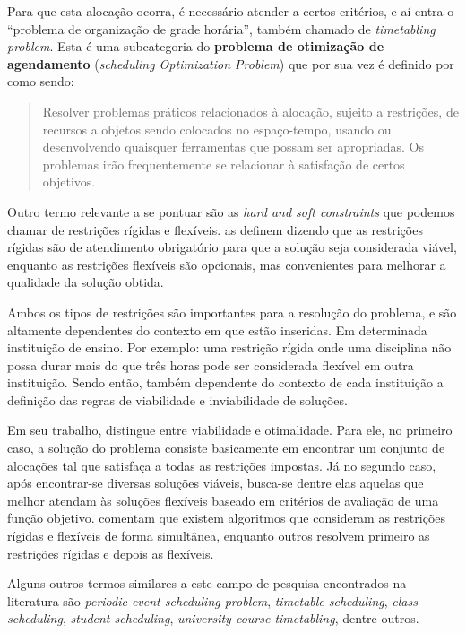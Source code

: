Para que esta alocação ocorra, é necessário atender a certos critérios, e aí entra o ``problema de organização de grade horária'', também chamado de \textit{timetabling problem}. Esta é uma subcategoria do \textbf{problema de otimização de agendamento} (\textit{scheduling Optimization Problem}) \cite{Alencar2019} que por sua vez é definido por  como sendo:

\begin{quote}\footnotesize
  Resolver problemas práticos relacionados à alocação, sujeito a restrições, de recursos a objetos sendo colocados no espaço-tempo, usando ou desenvolvendo quaisquer ferramentas que possam ser apropriadas. Os problemas irão frequentemente se relacionar à satisfação de certos objetivos. \cite{Wren1996}
\end{quote}

Outro termo relevante a se pontuar são as \textit{hard and soft constraints} que podemos chamar de restrições rígidas e flexíveis.  as definem dizendo que as restrições rígidas são de atendimento obrigatório para que a solução seja considerada viável, enquanto as restrições flexíveis são opcionais, mas convenientes para melhorar a qualidade da solução obtida.

Ambos os tipos de restrições são importantes para a resolução do problema, e são altamente dependentes do contexto em que estão inseridas. Em determinada instituição de ensino. Por exemplo: uma restrição rígida onde uma disciplina não possa durar mais do que três horas pode ser considerada flexível em outra instituição. Sendo então, também dependente do contexto de cada instituição a definição das regras de viabilidade e inviabilidade de soluções.

Em seu trabalho,  distingue entre viabilidade e otimalidade. Para ele, no primeiro caso, a solução do problema consiste basicamente em encontrar um conjunto de alocações tal que satisfaça a todas as restrições impostas. Já no segundo caso, após encontrar-se diversas soluções viáveis, busca-se dentre elas aquelas que melhor atendam às soluções flexíveis baseado em critérios de avaliação de uma função objetivo.  comentam que existem algoritmos que consideram as restrições rígidas e flexíveis de forma simultânea, enquanto outros resolvem primeiro as restrições rígidas e depois as flexíveis.

Alguns outros termos similares a este campo de pesquisa encontrados na literatura são \textit{periodic event scheduling problem}, \textit{timetable scheduling}, \textit{class scheduling}, \textit{student scheduling}, \textit{university course timetabling}, dentre outros.

